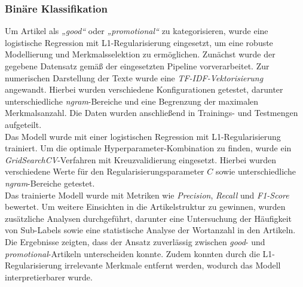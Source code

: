 \subsubsection{Binäre Klassifikation}
Um Artikel als \textit{„good“} oder \textit{„promotional“} zu kategorisieren, wurde eine logistische Regression mit L1-Regularisierung eingesetzt, um eine robuste Modellierung und Merkmalsselektion zu ermöglichen. Zunächst wurde der gegebene Datensatz gemäß der eingesetzten Pipeline vorverarbeitet. Zur numerischen Darstellung der Texte wurde eine \textit{TF-IDF-Vektorisierung} angewandt. Hierbei wurden verschiedene Konfigurationen getestet, darunter unterschiedliche \textit{ngram}-Bereiche und eine Begrenzung der maximalen Merkmalsanzahl. Die Daten wurden anschließend in Trainings- und Testmengen aufgeteilt.\\
Das Modell wurde mit einer logistischen Regression mit L1-Regularisierung trainiert. Um die optimale Hyperparameter-Kombination zu finden, wurde ein \textit{GridSearchCV}-Verfahren mit Kreuzvalidierung eingesetzt. Hierbei wurden verschiedene Werte für den Regularisierungsparameter \(C\) sowie unterschiedliche \textit{ngram}-Bereiche getestet. \\
Das trainierte Modell wurde mit Metriken wie \textit{Precision}, \textit{Recall} und \textit{F1-Score} bewertet. Um weitere Einsichten in die Artikelstruktur zu gewinnen, wurden zusätzliche Analysen durchgeführt, darunter eine Untersuchung der Häufigkeit von Sub-Labels sowie eine statistische Analyse der Wortanzahl in den Artikeln.\\
Die Ergebnisse zeigten, dass der Ansatz zuverlässig zwischen \textit{good}- und \textit{promotional}-Artikeln unterscheiden konnte. Zudem konnten durch die L1-Regularisierung irrelevante Merkmale entfernt werden, wodurch das Modell interpretierbarer wurde.
